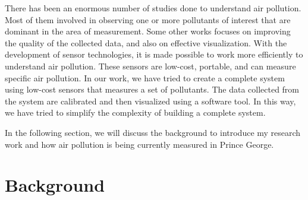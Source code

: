 There has been an enormous number of studies done to understand air pollution. Most of them involved in observing one or more pollutants of interest that are dominant in the area of measurement. Some other works focuses on improving the quality of the collected data, and also on effective visualization. With the development of sensor technologies, it is made possible to work more efficiently to understand air pollution. These sensors are low-cost, portable, and can measure specific air pollution. In our work, we have tried to create a complete system using low-cost sensors that measures a set of pollutants. The data collected from the system are calibrated and then visualized using a software tool. In this way, we have tried to simplify the complexity of building a complete system. 
 
 In the following section, we will discuss the background to introduce my research work and how air pollution is being currently measured in Prince George.
 
 



 \section{Background}

